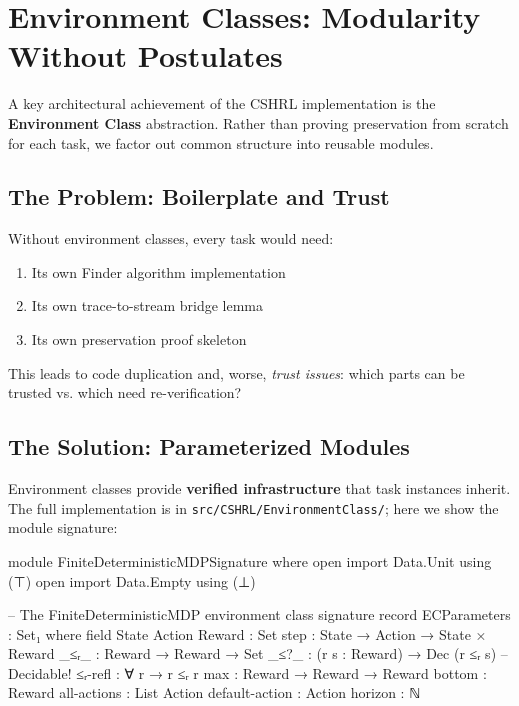 \documentclass[9pt,a4paper]{article}
\newcommand{\fpath}[1]{\nolinkurl{#1}}
\theoremstyle{plain}
\theoremstyle{definition}
\theoremstyle{remark}
\begin{document}
\section{Environment Classes: Modularity Without Postulates}\label{sec:env-classes}

A key architectural achievement of the CSHRL implementation is the \textbf{Environment Class} abstraction. Rather than proving preservation from scratch for each task, we factor out common structure into reusable modules.

\subsection{The Problem: Boilerplate and Trust}

Without environment classes, every task would need:
\begin{enumerate}
\item Its own Finder algorithm implementation
\item Its own trace-to-stream bridge lemma
\item Its own preservation proof skeleton
\end{enumerate}

This leads to code duplication and, worse, \emph{trust issues}: which parts can be trusted vs. which need re-verification?

\subsection{The Solution: Parameterized Modules}

Environment classes provide \textbf{verified infrastructure} that task instances inherit. The full implementation is in \fpath{src/CSHRL/EnvironmentClass/}; here we show the module signature:

\begin{code}[hide]
module FiniteDeterministicMDPSignature where
  open import Data.Unit using (⊤)
  open import Data.Empty using (⊥)
\end{code}

\begin{code}
  -- The FiniteDeterministicMDP environment class signature
  record ECParameters : Set₁ where
    field
      State Action Reward : Set
      step      : State → Action → State × Reward
      _≤ᵣ_      : Reward → Reward → Set
      _≤?_      : (r s : Reward) → Dec (r ≤ᵣ s)  -- Decidable!
      ≤ᵣ-refl   : ∀ {r} → r ≤ᵣ r
      max       : Reward → Reward → Reward
      bottom    : Reward
      all-actions    : List Action
      default-action : Action
      horizon   : ℕ
\end{code}
\end{document}

